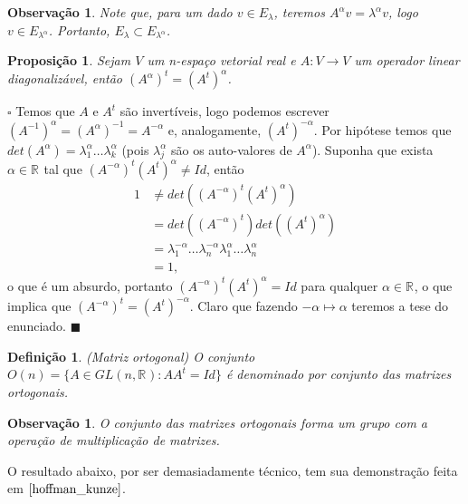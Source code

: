 \documentclass[12pt]{book}
\newtheorem{definicao}[teorema]{Definição}
\newtheorem{observacao}[teorema]{Observação}
\newtheorem{proposicao}[teorema]{Proposição}
\newenvironment{prova}[1]{$\square$ #1}{\hfill$\blacksquare$}
\newcommand{\generalgroup}[2]{GL(#1, #2)}
\newcommand{\generalgroupreal}[1]{\generalgroup{#1}{\real{}}}
\newcommand{\matrizortogonal}[1]{O(#1)}
\newcommand{\real}[1]{\mathbb{R}^{#1}}
\begin{document}
	\begin{observacao}
		Note que, para um dado $v \in E_{\lambda}$, teremos $A^{\alpha}v = \lambda^{\alpha}v$, logo $v \in E_{\lambda^{\alpha}}$. Portanto, $E_{\lambda}\subset E_{\lambda^{\alpha}}$.
	\end{observacao}
	
	\begin{proposicao}\label{proposicao_transposta_potenciacao_matriz}
		Sejam $V$ um n-espaço vetorial real e $A:V\to V$ um operador linear diagonalizável, então $(A^{\alpha})^{t}=(A^{t})^{\alpha}$.
	\end{proposicao}
	\begin{prova}
		Temos que $A$ e $A^{t}$ são invertíveis, logo podemos escrever $(A^{-1})^{\alpha}=(A^{\alpha})^{-1}=A^{-\alpha}$ e, analogamente, $(A^{t})^{-\alpha}$. Por hipótese temos que $det(A^{\alpha}) = \lambda_{1}^{\alpha} \dots \lambda_{k}^{\alpha}$ (pois $\lambda_{j}^{\alpha}$ são os auto-valores de $A^{\alpha}$). Suponha que exista $\alpha \in \real{}$ tal que $(A^{-\alpha})^{t}(A^{t})^{\alpha} \neq Id$, então 
		$$
		\begin{aligned}
		1 &\neq det((A^{-\alpha})^{t}(A^{t})^{\alpha}) 
		\\
		&= det((A^{-\alpha})^{t})det((A^{t})^{\alpha})
		\\
		&= \lambda_{1}^{-\alpha} \dots \lambda_{n}^{-\alpha}\lambda_{1}^{\alpha} \dots \lambda_{n}^{\alpha}
		\\
		&=1,
		\end{aligned}
		$$
		o que é um absurdo, portanto $(A^{-\alpha})^{t}(A^{t})^{\alpha} =Id$ para qualquer $\alpha \in \real{}$, o que implica que $(A^{-\alpha})^{t}=(A^{t})^{-\alpha}$. Claro que fazendo $-\alpha \mapsto \alpha$ teremos a tese do enunciado.
	\end{prova}
	
	\begin{definicao}
		(Matriz ortogonal) O conjunto $\matrizortogonal{n} =\{ A \in \generalgroupreal{n}: AA^{t}=Id \}$ é denominado por conjunto das matrizes ortogonais.
	\end{definicao}
	
	\begin{observacao}
		O conjunto das matrizes ortogonais forma um grupo com a operação de multiplicação de matrizes.
	\end{observacao}
	
	O resultado abaixo, por ser demasiadamente técnico, tem sua demonstração feita em $\cite{hoffman_kunze}$.
	
\end{document}
